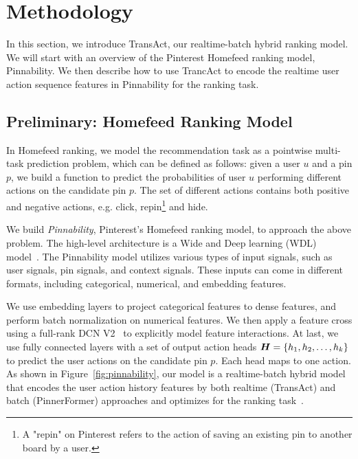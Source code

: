 \section{Methodology}
\label{sec:method}


In this section, we introduce TransAct, our realtime-batch hybrid ranking model. 
We will start with an overview of the Pinterest Homefeed ranking model, Pinnability. We then describe how to use TrancAct to encode the realtime user action sequence features in Pinnability for the ranking task.

\subsection{Preliminary: Homefeed Ranking Model}
\label{sec:pinnability}
In Homefeed ranking, we model the recommendation task as a pointwise multi-task prediction problem, which can be defined as follows: given a user $u$ and a pin $p$, we build a function to predict the probabilities of user $u$ performing different actions 
on the candidate pin $p$. The set of different actions contains both positive and negative actions, e.g. click, repin\footnote{A "repin" on Pinterest refers to the action of saving an existing pin to another board by a user.} and hide.

We build \textit{Pinnability}, Pinterest's Homefeed ranking model, to approach the above problem.
The high-level architecture is a Wide and Deep learning (WDL) model~\cite{cheng2016wide}.  
The Pinnability model utilizes various types of input signals, such as user signals, pin signals, and context signals.
These inputs can come in different formats, including categorical, numerical, and embedding features.

We use embedding layers to project categorical features to dense features, and perform batch normalization on numerical features. We then apply a feature cross using a full-rank DCN V2~\cite{DCNv2} to explicitly model feature interactions.
At last, we use fully connected layers with a set of output action heads $\boldsymbol{H} = \{h_1, h_2, \dots , h_k\}$ to predict the user actions on the candidate pin $p$. Each head maps to one action.
As shown in Figure~\ref{fig:pinnability}, our model is a realtime-batch hybrid model that encodes the user action history features by both realtime (TransAct) and batch (PinnerFormer) approaches and optimizes for the ranking task~\cite{10.1145/3523227.3547394}. 



